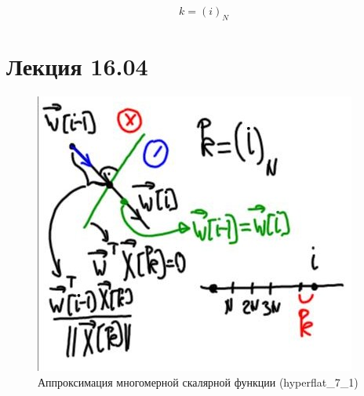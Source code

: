 \documentclass{article}
\numberwithin{equation}{subsection}
\begin{document}
\begin{equation*}
    k = (i)_N
\end{equation*}



\newpage
\section{Лекция 16.04}








\begin{figure}[H]
    \centering
    \includegraphics[height=8 cm]{hyperflat_7_1.jpeg}
    \caption{Аппроксимация многомерной скалярной функции (hyperflat\_7\_1)}
    \label{hyperflat_7_1}
\end{figure}
\end{document}
